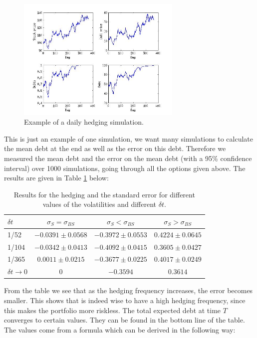 \documentclass[11pt,a4paper]{article}
\begin{document}
\begin{figure}[H]
  \centering
  \includegraphics[width=0.7\textwidth]{hedge.jpg}
  \caption{Example of a daily hedging simulation.}
  \label{fig:hedge}
\end{figure}

This is just an example of one simulation, we want many simulations to calculate the mean debt at the end as well as the error on this debt. Therefore we measured the mean debt and the error on the mean debt (with a 95\% confidence interval) over 1000 simulations, going through all the options given above. The results are given in Table \ref{tab:hedge} below:

\begin{table}[H]
  \centering
  \begin{tabular}{l | c | c | c}
    \hline
    $\delta t$ & $\sigma_S = \sigma_{BS}$ & $\sigma_S < \sigma_{BS}$ & $\sigma_S > \sigma_{BS}$ \\
    \hline
    1/52 & $-0.0391 \pm 0.0568$ & $-0.3972 \pm 0.0553$ & $0.4224 \pm 0.0645$\\
    1/104 & $-0.0342 \pm 0.0413$ & $-0.4092 \pm 0.0415$ & $0.3605 \pm 0.0427$\\
    1/365 & $0.0011 \pm 0.0215$ & $-0.3677 \pm 0.0225$ & $0.4017 \pm 0.0249$\\
    $\delta t \rightarrow 0$ & $0$ & $-0.3594$ & $0.3614$\\
  \end{tabular}
  \caption{Results for the hedging and the standard error for different values of the volatilities and different $\delta t$.}
  \label{tab:hedge}
\end{table}

From the table we see that as the hedging frequency increases, the error becomes smaller. This shows that is indeed wise to have a high hedging frequency, since this makes the portfolio more riskless. The total expected debt at time $T$ converges to certain values. They can be found in the bottom line of the table. The values come from a formula which can be derived in the following way:
\end{document}
